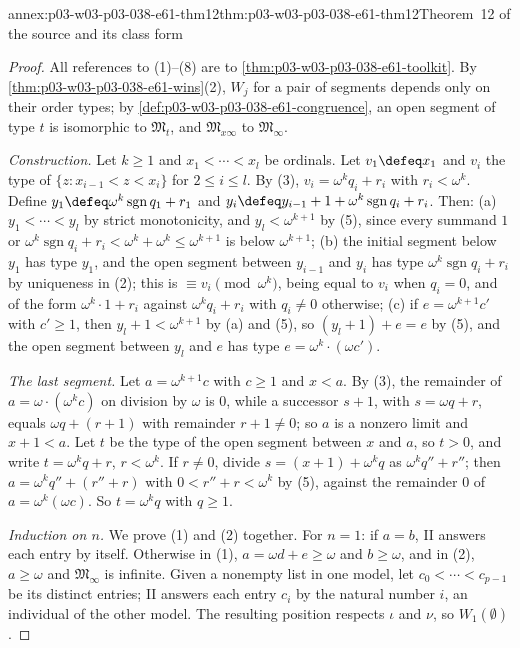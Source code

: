 \begin{annexitem}{annex:p03-w03-p03-038-e61-thm12}{thm:p03-w03-p03-038-e61-thm12}{Theorem~12 of the source and its class form}
\begin{proof}
All references to (1)--(8) are to
\cref{thm:p03-w03-p03-038-e61-toolkit}. By
\cref{thm:p03-w03-p03-038-e61-wins}(2), \(W_j\) for a pair of segments
depends only on their order types; by
\cref{def:p03-w03-p03-038-e61-congruence}, an open segment of type \(t\)
is isomorphic to \(\mathfrak M_t\), and \(\mathfrak M_{x\infty}\) to
\(\mathfrak M_\infty\).

\emph{Construction.} Let \(k\ge1\) and \(x_1<\cdots<x_l\) be ordinals.
Let \(v_1\defeq x_1\) and \(v_i\) the type of
\(\{z:x_{i-1}<z<x_i\}\) for \(2\le i\le l\). By (3),
\(v_i=\omega^kq_i+r_i\) with \(r_i<\omega^k\). Define
\(y_1\defeq\omega^k\operatorname{sgn}q_1+r_1\) and
\(y_i\defeq y_{i-1}+1+\omega^k\operatorname{sgn}q_i+r_i\). Then:
(a) \(y_1<\cdots<y_l\) by strict monotonicity, and \(y_l<\omega^{k+1}\)
by (5), since every summand \(1\) or \(\omega^k\operatorname{sgn}q_i+r_i
<\omega^k+\omega^k\le\omega^{k+1}\) is below \(\omega^{k+1}\); (b) the
initial segment below \(y_1\) has type \(y_1\), and the open segment
between \(y_{i-1}\) and \(y_i\) has type
\(\omega^k\operatorname{sgn}q_i+r_i\) by uniqueness in (2); this is
\(\equiv v_i\pmod{\omega^k}\), being equal to \(v_i\) when \(q_i=0\), and
of the form \(\omega^k\cdot1+r_i\) against \(\omega^kq_i+r_i\) with
\(q_i\ne0\) otherwise; (c) if \(e=\omega^{k+1}c'\) with \(c'\ge1\), then
\(y_l+1<\omega^{k+1}\) by (a) and (5), so \((y_l+1)+e=e\) by (5), and the
open segment between \(y_l\) and \(e\) has type
\(e=\omega^k\cdot(\omega c')\).

\emph{The last segment.} Let \(a=\omega^{k+1}c\) with \(c\ge1\) and
\(x<a\). By (3), the remainder of \(a=\omega\cdot(\omega^kc)\) on division
by \(\omega\) is \(0\), while a successor \(s+1\), with
\(s=\omega q+r\), equals \(\omega q+(r+1)\) with remainder \(r+1\ne0\);
so \(a\) is a nonzero limit and \(x+1<a\). Let \(t\) be the type of the
open segment between \(x\) and \(a\), so \(t>0\), and write
\(t=\omega^kq+r\), \(r<\omega^k\). If \(r\ne0\), divide
\(s=(x+1)+\omega^kq\) as \(\omega^kq''+r''\); then
\(a=\omega^kq''+(r''+r)\) with \(0<r''+r<\omega^k\) by (5), against the
remainder \(0\) of \(a=\omega^k(\omega c)\). So \(t=\omega^kq\) with
\(q\ge1\).

\emph{Induction on \(n\).} We prove (1) and (2) together. For \(n=1\):
if \(a=b\), II answers each entry by itself. Otherwise in (1),
\(a=\omega d+e\ge\omega\) and \(b\ge\omega\), and in (2), \(a\ge\omega\)
and \(\mathfrak M_\infty\) is infinite. Given a nonempty list in one
model, let \(c_0<\cdots<c_{p-1}\) be its distinct entries; II answers
each entry \(c_i\) by the natural number \(i\), an individual of the other
model. The resulting position respects \(\iota\) and \(\nu\), so
\(W_1(\emptyset)\).


\end{proof}
\end{annexitem}
